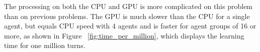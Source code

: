 \begin{flushleft}


%
%
%
%
%
%


The processing on both the CPU and GPU is more complicated on this problem than on previous problems.  The GPU is much slower than the CPU for a single agent, but equals CPU speed with 4 agents and is faster for agent groups of 16 or more, as shown in Figure ~\ref{fig:time_per_million}, which displays the learning time for one million turns.

\end{flushleft}
